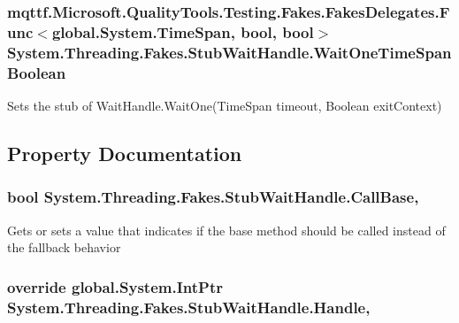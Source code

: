 \hypertarget{class_system_1_1_threading_1_1_fakes_1_1_stub_wait_handle_a2d774694347ecea3785691ac676dbcc7}{
\subsubsection[{Wait\-One\-Time\-Span\-Boolean}]{\setlength{\rightskip}{0pt plus 5cm}mqttf.\-Microsoft.\-Quality\-Tools.\-Testing.\-Fakes.\-Fakes\-Delegates.\-Func$<$global.\-System.\-Time\-Span, bool, bool$>$ System.\-Threading.\-Fakes.\-Stub\-Wait\-Handle.\-Wait\-One\-Time\-Span\-Boolean}}\label{class_system_1_1_threading_1_1_fakes_1_1_stub_wait_handle_a2d774694347ecea3785691ac676dbcc7}


Sets the stub of Wait\-Handle.\-Wait\-One(\-Time\-Span timeout, Boolean exit\-Context)



\subsection{Property Documentation}
\hypertarget{class_system_1_1_threading_1_1_fakes_1_1_stub_wait_handle_a421e5d34035941762c404fe182fd3744}{
\subsubsection[{Call\-Base}]{\setlength{\rightskip}{0pt plus 5cm}bool System.\-Threading.\-Fakes.\-Stub\-Wait\-Handle.\-Call\-Base\hspace{0.3cm}{\ttfamily [get]}, {\ttfamily [set]}}}\label{class_system_1_1_threading_1_1_fakes_1_1_stub_wait_handle_a421e5d34035941762c404fe182fd3744}


Gets or sets a value that indicates if the base method should be called instead of the fallback behavior

\hypertarget{class_system_1_1_threading_1_1_fakes_1_1_stub_wait_handle_a42a510b962c6a0a943f1486f496a94ed}{
\subsubsection[{Handle}]{\setlength{\rightskip}{0pt plus 5cm}override global.\-System.\-Int\-Ptr System.\-Threading.\-Fakes.\-Stub\-Wait\-Handle.\-Handle\hspace{0.3cm}{\ttfamily [get]}, {\ttfamily [set]}}}\label{class_system_1_1_threading_1_1_fakes_1_1_stub_wait_handle_a42a510b962c6a0a943f1486f496a94ed}


